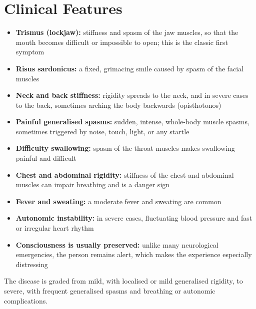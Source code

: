 \section*{Clinical Features}
\begin{itemize}
    \item \textbf{Trismus (lockjaw):} stiffness and spasm of the jaw muscles, so that the mouth becomes difficult or impossible to open; this is the classic first symptom
    \item \textbf{Risus sardonicus:} a fixed, grimacing smile caused by spasm of the facial muscles
    \item \textbf{Neck and back stiffness:} rigidity spreads to the neck, and in severe cases to the back, sometimes arching the body backwards (opisthotonos)
    \item \textbf{Painful generalised spasms:} sudden, intense, whole-body muscle spasms, sometimes triggered by noise, touch, light, or any startle
    \item \textbf{Difficulty swallowing:} spasm of the throat muscles makes swallowing painful and difficult
    \item \textbf{Chest and abdominal rigidity:} stiffness of the chest and abdominal muscles can impair breathing and is a danger sign
    \item \textbf{Fever and sweating:} a moderate fever and sweating are common
    \item \textbf{Autonomic instability:} in severe cases, fluctuating blood pressure and fast or irregular heart rhythm
    \item \textbf{Consciousness is usually preserved:} unlike many neurological emergencies, the person remains alert, which makes the experience especially distressing
\end{itemize}

The disease is graded from mild, with localised or mild generalised rigidity, to severe, with frequent generalised spasms and breathing or autonomic complications.

